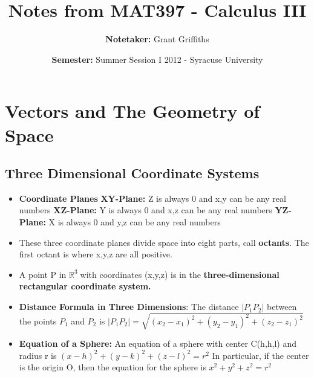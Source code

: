 \documentclass{report}
\title{\textbf{Notes from MAT397 - Calculus III}}
\author{\textbf{Notetaker: }Grant Griffiths}
\date{\textbf{Semester: }Summer Session I 2012 - Syracuse University}
\newcommand{\Rt}{$\mathbb{R}^3\;$}
\begin{document}
   \maketitle
   \tableofcontents 
\chapter{Vectors and The Geometry of Space}
	\section{Three Dimensional Coordinate Systems}
		\begin{itemize}\addtolength{\leftskip}{2em}
			\item \textbf{Coordinate Planes}
				\subitem \textbf{XY-Plane:} Z is always 0 and x,y can be any real numbers
				\subitem \textbf{XZ-Plane:} Y is always 0 and x,z can be any real numbers
				\subitem \textbf{YZ-Plane:} X is always 0 and y,z can be any real numbers
			\item These three coordinate planes divide space into eight parts, call \textbf{octants}. The first octant is where x,y,z are all positive.
			\item A point P in \Rt with coordinates (x,y,z) is in the \textbf{three-dimensional rectangular coordinate system.}
			\item \textbf{Distance Formula in Three Dimensions}: The distance $|P_1P_2|$ between the points $P_1$ and $P_2$ is
			\subitem \large$|P_1P_2|=\sqrt{(x_2-x_1)^2+(y_2-y_1)^2+(z_2-z_1)^2}$
			\item \textbf{Equation of a Sphere:} An equation of a sphere with center C(h,h,l) and radius r is
			\subitem \large$(x-h)^2+(y-k)^2+(z-l)^2=r^2$
			\subitem In particular, if the center is the origin O, then the equation for the sphere is $x^2+y^2+z^2=r^2$
			
		\end{itemize}
\end{document}
